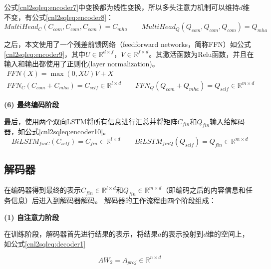 公式\ref{cnl2sqleq:encoder7}中变换都为线性变换，所以多头注意力机制可以维持$d$维不变，有公式\ref{cnl2sqleq:encoder8}：
\begin{equation}
  \label{cnl2sqleq:encoder8}
  MultiHead_C(C_{com},C_{com},C_{com}) = C_{mha} \qquad MultiHead_Q(Q_{com},Q_{com},Q_{com}) = Q_{mha}
 \end{equation}

之后，本文使用了一个残差前馈网络（feedforward networks，简称FFN）如公式\ref{cnl2sqleq:encoder9}，其中$U \in \mathbb{R}^{d \times f}$，$V \in \mathbb{R}^{f \times d}$。其激活函数为Relu函数\cite{Nair2010Rectified,vaswani2017attention}，并且在输入和输出都使用了正则化(layer normalization)\cite{Ba2016Layer}。
\begin{gather}
  \label{cnl2sqleq:encoder9}
  FFN(X) = \max(0,XU)V + X\\
  FFN_C(C_{com} + C_{mha}) = C_{self} \in \mathbb{R}^{l \times d} \qquad FFN_Q(Q_{com} + Q_{mha}) = Q_{self} \in \mathbb{R}^{m \times d}
\end{gather}

\textbf{(6) 最终编码阶段}

最后，使用两个双向LSTM将所有信息进行汇总并将矩阵$C_{fin}$和$Q_{fin}$输入给解码器，如公式\ref{cnl2sqleq:encoder10}。
\begin{equation}
  \label{cnl2sqleq:encoder10}
  BiLSTM_{finC}(C_{self}) = C_{fin} \in \mathbb{R}^{l \times d} \qquad BiLSTM_{finQ}(Q_{self}) = Q_{fin} \in \mathbb{R}^{m \times d} 
\end{equation}


\subsection{解码器}
\label{cnl2sql:decoder}

在编码器得到最终的表示$C_{fin} \in \mathbb{R}^{l \times d}$和$Q_{fin} \in \mathbb{R}^{m \times d}$（即编码之后的内容信息和任务信息）后进入到解码器解码。
解码器的工作流程由四个阶段组成：


\textbf{(1) 自注意力阶段}

在训练阶段，解码器首先进行结果的表示，将结果$a$的表示投射到$d$维的空间上，如公式\ref{cnl2sqleq:decoder1}

\begin{equation}
  \label{cnl2sqleq:decoder1}
  AW_2 = A_{proj} \in \mathbb{R}^{n \times d} 
\end{equation}


